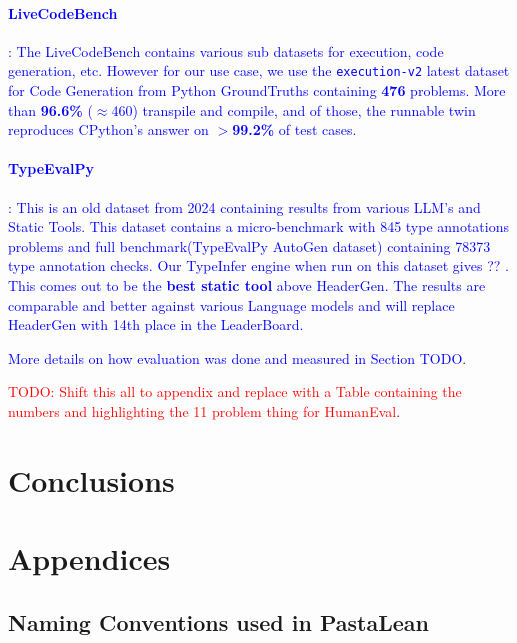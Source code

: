 \documentclass{article}
\newcommand{\code}{\lstinline}
\newcommand{\todo}[1]{\textcolor{red}{TODO: #1}}
\newcommand{\suggest}[1]{\textcolor{blue}{#1}}
\begin{document}
{\suggest{\paragraph{LiveCodeBench}: The LiveCodeBench contains various sub datasets for execution, code generation, etc. However for our use case, we use the \code{execution-v2} latest dataset for Code Generation from Python GroundTruths containing \textbf{476} problems. More than \textbf{96.6\%} ($\approx$460) transpile and compile, and of those, the runnable twin reproduces CPython's answer on \textbf{$>$99.2\%} of test cases. }

\suggest{\paragraph{TypeEvalPy}: This is an old dataset from 2024 containing results from various LLM's and Static Tools. This dataset contains a micro-benchmark with 845 type annotations problems and full benchmark(TypeEvalPy AutoGen dataset) containing 78373 type annotation checks. Our TypeInfer engine when run on this dataset gives ?? . This comes out to be the \textbf{best static tool} above HeaderGen. The results are comparable and better against various Language models and will replace HeaderGen with 14th place in the LeaderBoard. }

\suggest{More details on how evaluation was done and measured in Section TODO.}

\todo{Shift this all to appendix and replace with a Table containing the numbers and highlighting the 11 problem thing for HumanEval}.

\section{Conclusions}

\small




\newpage

\appendix

\section{Appendices}

\subsection{Naming Conventions used in PastaLean}\label{naming-convention}

}
\end{document}
